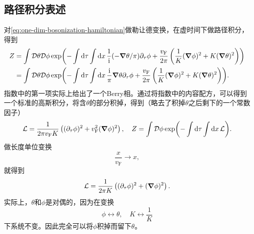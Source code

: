 \subsection{路径积分表述}

对\eqref{eq:one-dim-bosonization-hamiltonian}做勒让德变换，在虚时间下做路径积分，得到
\[
    \begin{aligned}
        Z &= \int \mathcal{D} \theta \mathcal{D} \phi \exp(- \int \dd{\tau} \int \dd{x} \frac{1}{\mathrm{i}} (- \grad{\theta} / \pi) \partial_\tau \phi + \frac{v_\text{F}}{2\pi} \left( \frac{1}{K} (\grad{\phi})^2 + K (\grad{\theta})^2 \right) ) \\
        &= \int \mathcal{D} \theta \mathcal{D} \phi \exp(- \int \dd{\tau} \int \dd{x} \frac{\mathrm{i}}{\pi} \grad{\theta} \partial_\tau \phi + \frac{v_\text{F}}{2\pi} \left( \frac{1}{K} (\grad{\phi})^2 + K (\grad{\theta})^2 \right) ).
    \end{aligned}
\]
指数中的第一项实际上给出了一个Berry相。通过将指数中的内容配方，可以得到一个标准的高斯积分，将含$\theta$的部分积掉，得到（略去了积掉$\theta$之后剩下的一个常数因子）
\begin{equation}
    \mathcal{L} = \frac{1}{2\pi v_\text{F} K} \left( (\partial_\tau \phi)^2 + v_\text{F}^2 (\grad{\phi})^2 \right) , \quad Z = \int \mathcal{D} \phi \exp(- \int \dd{\tau} \int \dd{x} \mathcal{L} ).
\end{equation}
做长度单位变换
\[
    \frac{x}{v_\text{F}} \longrightarrow x,
\]
就得到
\begin{equation}
    \mathcal{L} = \frac{1}{2\pi K} \left( (\partial_\tau \phi)^2 + (\grad{\phi})^2 \right).
    \label{eq:one-dim-scaleless-lag}
\end{equation}
实际上，$\theta$和$\phi$是对偶的，因为在变换
\[
    \phi \longleftrightarrow \theta, \quad K \longleftrightarrow \frac{1}{K}
\]
下系统不变。因此完全可以将$\phi$积掉而留下$\theta$。

